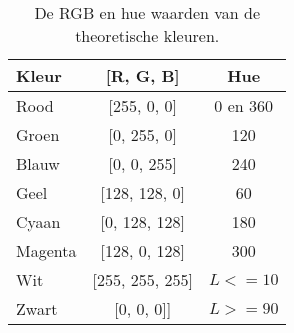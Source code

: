 \begin{center}
\begin{table}
\centering
\begin{tabular}{ | l | c | c | }
\hline
Kleur & [R, G, B] & Hue \\
\hline
Rood & [255, 0, 0] & 0 en 360 \\
Groen & [0, 255, 0] & 120 \\
Blauw & [0, 0, 255] & 240 \\
Geel & [128, 128, 0] & 60 \\
Cyaan & [0, 128, 128] & 180 \\
Magenta & [128, 0, 128] & 300 \\
Wit & [255, 255, 255] & $L <= 10$ \\
Zwart & [0, 0, 0]] & $L >= 90$ \\
\hline
\end{tabular}
\caption{De RGB en hue waarden van de theoretische kleuren.}
\label{tab:kleuren}
\end{table}
\end{center}